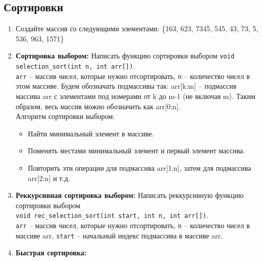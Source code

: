 \documentclass{article}
\begin{document}
\subsection*{Сортировки}
\begin{enumerate}
\item Создайте массив со следующими элементами: \{163, 623, 7345, 545, 43, 73, 5, 536, 963, 1571\}
\item \textbf{Сортировка выбором:} Написать функцию сортировки выбором \texttt{void selection\_sort(int n, int arr[])}.\\
\texttt{arr} -- массив чисел, которые нужно отсортировать, \texttt{n} -- количество чисел в этом массиве.
Будем обозначать подмассивы так: arr[k:m] -- подмассив массива arr с элементами под номерами от k до m-1 (не включая m). Таким образом, весь массив можно обозначить как arr[0:n]. \\

Алгоритм сортировки выбором:
\begin{itemize}
\item Найти минимальный элемент в массиве.
\item Поменять местами минимальный элемент и первый элемент массива.
\item Повторить эти операции для подмассива arr[1:n], затем для подмассива arr[2:n] и т.д.
\end{itemize}
\item \textbf{Реккурсивная сортировка выбором:} Написать реккурсивную функцию сортировки выбором \\
\texttt{void rec\_selection\_sort(int start, int n, int arr[])}.\\
\texttt{arr} -- массив чисел, которые нужно отсортировать, 
\texttt{n} -- количество чисел в массиве arr,
\texttt{start} -- начальный индекс подмассива в массиве arr.\\
\item \textbf{Быстрая сортировка:}

\end{enumerate}
\end{document}

